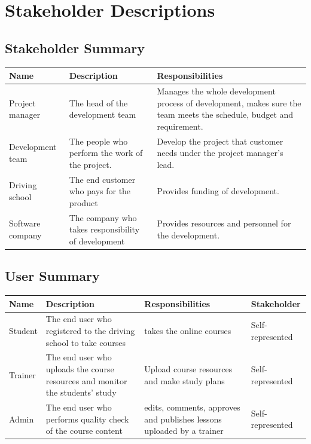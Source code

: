 \documentclass[a4paper]{article}
\begin{document}
\section{Stakeholder Descriptions}
\subsection{Stakeholder Summary}

\begin{table}[!htb]
\centering
\begin{tabular}{|p{3cm}|p{3cm}|p{4cm}|}
\hline
\rowcolor{gray}
Name & Description & Responsibilities \\ \hline
Project manager & The head of the development team & Manages the whole development process of development, makes sure the team meets the schedule, budget and requirement. \\ \hline
Development team & The people who perform the work of the project. & Develop the project that customer needs under the project manager’s lead. \\ \hline
Driving school & The end customer who pays for the product & Provides funding of development. \\ \hline
Software company & The company who takes responsibility of development & Provides resources and personnel for the development. \\
\hline

\end{tabular}
\end{table}

\subsection{User Summary}

\begin{table}[!htb]
\centering
\begin{tabular}{|p{2cm}|p{3cm}|p{4cm}|l|}
\hline
\rowcolor{gray}
Name & Description & Responsibilities & Stakeholder \\ \hline
Student & The end user who registered to the driving school to take courses & takes the online courses & Self-represented \\ \hline
Trainer & The end user who uploads the course resources and monitor the students’ study & Upload course resources and make study plans & Self-represented \\ \hline
Admin & The end user who performs quality check of the course content & edits, comments, approves and publishes  lessons uploaded by a trainer & Self-represented \\ 
\hline

\end{tabular}
\end{table}
\end{document}
